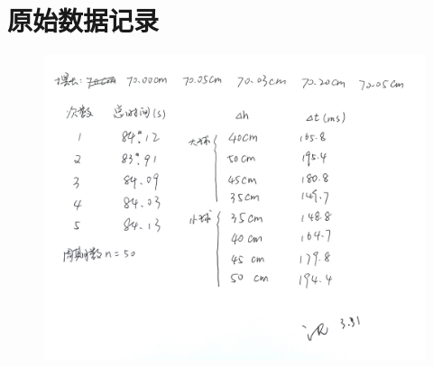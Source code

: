 \documentclass[UTF8]{ctexart}
\begin{document}
\section{原始数据记录}
\begin{figure}[h]
    \centering
    \includegraphics[scale=0.8]{data.png}
\end{figure}

\end{document}
